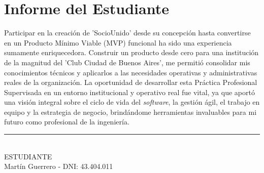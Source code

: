 \section{Informe del Estudiante}

Participar en la creación de 'SocioUnido' desde su concepción hasta convertirse en un Producto Mínimo Viable (MVP) funcional ha sido una experiencia sumamente enriquecedora. Construir un producto desde cero para una institución de la magnitud del 'Club Ciudad de Buenos Aires', me permitió consolidar mis conocimientos técnicos y aplicarlos a las necesidades operativas y administrativas reales de la organización. La oportunidad de desarrollar esta Práctica Profesional Supervisada en un entorno institucional y operativo real fue vital, ya que aportó una visión integral sobre el ciclo de vida del \textit{software}, la gestión ágil, el trabajo en equipo y la estrategia de negocio, brindándome herramientas invaluables para mi futuro como profesional de la ingeniería.

\vspace{1.5cm}
\noindent\rule{8cm}{0.4pt} \\
ESTUDIANTE \\
Martín Guerrero - DNI: 43.404.011
